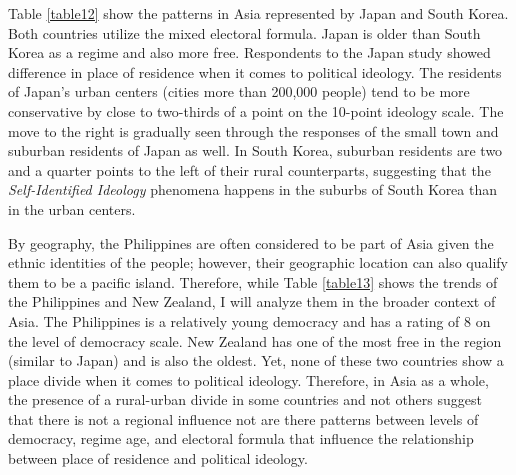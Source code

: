 \documentclass[12pt, titlepage]{article}
\newcommand\e{\emph}
\begin{document}
Table \ref{table12} show the patterns in Asia represented by Japan and South Korea. Both countries utilize the mixed electoral formula. Japan is older than South Korea as a regime and also more free. Respondents to the Japan study showed difference in place of residence when it comes to political ideology. The residents of Japan's urban centers (cities more than 200,000 people) tend to be more conservative by close to two-thirds of a point on the 10-point ideology scale. The move to the right is gradually seen through the responses of the small town and suburban residents of Japan as well. In South Korea, suburban residents are two and a quarter points to the left of their rural counterparts, suggesting that the \e{Self-Identified Ideology} phenomena happens in the suburbs of South Korea than in the urban centers. 

By geography, the Philippines are often considered to be part of Asia given the ethnic identities of the people; however, their geographic location can also qualify them to be a pacific island. Therefore, while Table \ref{table13} shows the trends of the Philippines and New Zealand, I will analyze them in the broader context of Asia. The Philippines is a relatively young democracy and has a rating of 8 on the level of democracy scale. New Zealand has one of the most free in the region (similar to Japan) and is also the oldest. Yet, none of these two countries show a place divide when it comes to political ideology. Therefore, in Asia as a whole, the presence of a rural-urban divide in some countries and not others suggest that there is not a regional influence not are there patterns between levels of democracy, regime age, and electoral formula that influence the relationship between place of residence and political ideology.
\end{document}
